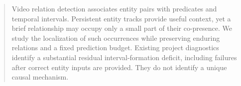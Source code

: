 \begin{abstract}
Video relation detection associates entity pairs with predicates and temporal
intervals. Persistent entity tracks provide useful context, yet a brief
relationship may occupy only a small part of their co-presence. We study the
localization of such occurrences while preserving enduring relations and a fixed
prediction budget. Existing project diagnostics identify a substantial residual
interval-formation deficit, including failures after correct entity inputs are
provided. They do not identify a unique causal mechanism.
\end{abstract}
